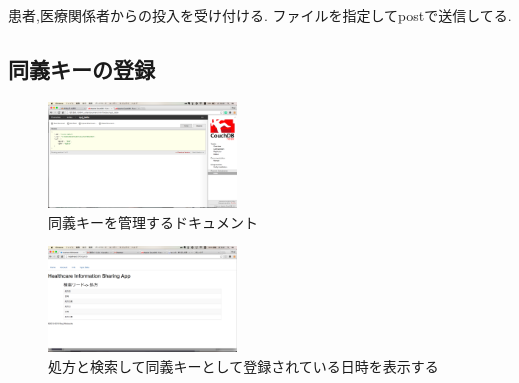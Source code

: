 			患者,医療関係者からの投入を受け付ける.
			ファイルを指定してpostで送信してる.


\subsection{同義キーの登録}
	\begin{figure}[htbp]
			\includegraphics[width=5cm, bb=0 0 437 688]{./gazou/relation.png}
		\caption{同義キーを管理するドキュメント}
		\label{relation}
	\end{figure}

	\begin{figure}[htbp]
			\includegraphics[width=5cm, bb=0 0 437 688]{./gazou/relationApp.png}
		\caption{処方と検索して同義キーとして登録されている日時を表示する}
		\label{relationApp}
	\end{figure}
